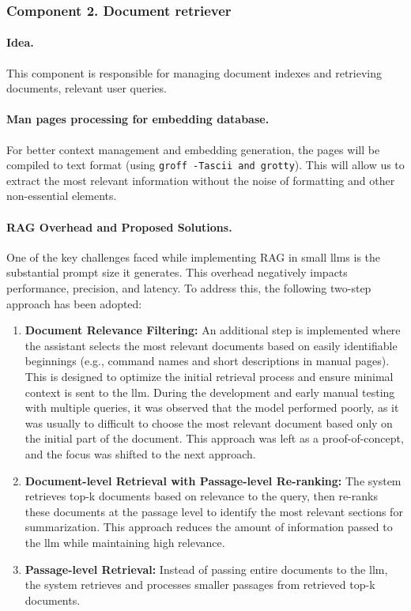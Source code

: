 \subsubsection{Component 2. Document retriever}

\paragraph{Idea.}{}
This component is responsible for managing document indexes and retrieving documents, relevant user queries.

\paragraph{Man pages processing for embedding database.}{}
For better context management and embedding generation, the pages will be
compiled to text format (using \texttt{groff -Tascii and grotty}). This will allow us to
extract the most relevant information without the noise of formatting and other
non-essential elements.

\paragraph{RAG Overhead and Proposed Solutions.}{}
One of the key challenges faced while implementing RAG in small \glspl{llm}
is the substantial prompt size it generates. This overhead negatively
impacts performance, precision, and latency. To address this, the
following two-step approach has been adopted:

\begin{enumerate}
  \item \textbf{Document Relevance Filtering:} An additional step is
    implemented where the assistant selects the most relevant
    documents based on easily identifiable beginnings (e.g., command
    names and short descriptions in manual pages). This is designed
    to optimize the initial retrieval process and ensure minimal
    context is sent to the \gls{llm}.
    During the development and early manual testing with multiple queries, it
    was observed that the model performed poorly, as it was usually to
    difficult to choose the most relevant document based only on the initial
    part of the document. This approach was left as a proof-of-concept, and
    the focus was shifted to the next approach.
  \item \textbf{Document-level Retrieval with Passage-level Re-ranking:} The
    system retrieves top-k documents based on relevance to the query, then
    re-ranks these documents at the passage level to identify the most
    relevant sections for summarization. This approach reduces the amount of
    information passed to the \gls{llm} while maintaining high relevance.
  \item \textbf{Passage-level Retrieval:} Instead of passing entire documents to
    the \gls{llm}, the system retrieves and processes smaller passages from
    retrieved top-k documents.
\end{enumerate}



